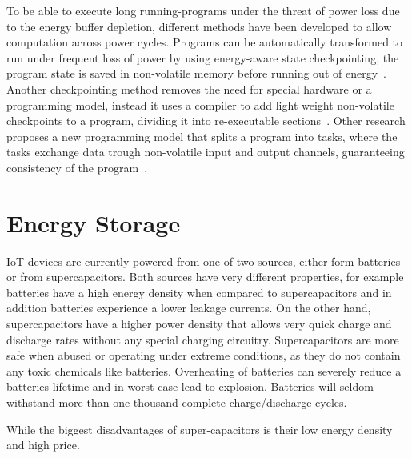 To be able to execute long running-programs under the threat of power loss due to the energy buffer depletion, different methods have been developed to allow computation across power cycles.
Programs can be automatically transformed to run under frequent loss of power by using energy-aware state checkpointing, the program state is saved in non-volatile memory before running out of energy~\cite{ransford_asplos_2011}.
Another checkpointing method removes the need for special hardware or a programming model, instead it uses a compiler to add light weight non-volatile checkpoints to a program, dividing it into re-executable sections~\cite{vanderwoude_osdi_2016}.
Other research proposes a new programming model that splits a program into tasks, where the tasks exchange data trough non-volatile input and output channels, guaranteeing consistency of the program~\cite{Colin_oopsla_2017}.


\section{Energy Storage}
\label{sec:energy_storage}




IoT devices are currently powered from one of two sources, either form batteries or from supercapacitors. 
Both sources have very different properties, for example batteries have a high energy density when compared to supercapacitors and in addition batteries experience a lower leakage currents.
On the other hand, supercapacitors have a higher power density that allows very quick charge and discharge rates without any special charging circuitry.
Supercapacitors are more safe when abused or operating under extreme conditions, as they do not contain any toxic chemicals like batteries.
Overheating of batteries can severely reduce a batteries lifetime and in worst case lead to explosion.
Batteries will seldom withstand more than one thousand complete charge/discharge cycles.

While the biggest disadvantages of super-capacitors is their low energy density and high price.




